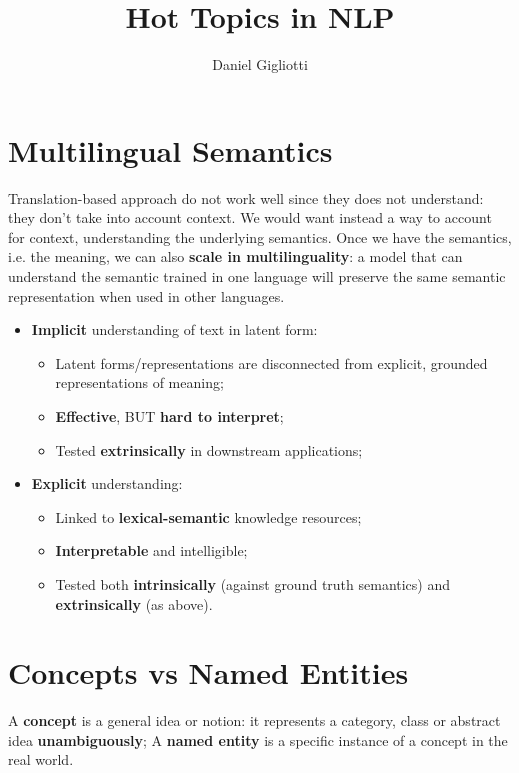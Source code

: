 \documentclass{article}
\title{Hot Topics in NLP}
\author{Daniel Gigliotti}
\date{}
\begin{document}
\maketitle

\section{Multilingual Semantics}

Translation-based approach do not work well since they does not understand: they don't take into account context. We would want instead a way to account for context, understanding the underlying semantics. Once we have the semantics, i.e. the meaning, we can also \textbf{scale in multilinguality}: a model that can understand the semantic trained in one language will preserve the same semantic representation when used in other languages.

\begin{itemize}
    \item \textbf{Implicit} understanding of text\textbf{} in latent form:
    \begin{itemize}
        \item Latent forms/representations are disconnected from explicit, grounded representations of meaning;
        \item \textbf{Effective}, BUT \textbf{hard to interpret};
        \item Tested \textbf{extrinsically} in downstream applications;
    \end{itemize}
    \item \textbf{Explicit} understanding:
    \begin{itemize}
        \item Linked to \textbf{lexical-semantic} knowledge resources;
        \item \textbf{Interpretable} and intelligible;
        \item Tested both \textbf{intrinsically} (against ground truth semantics) and \textbf{extrinsically} (as above).
    \end{itemize}
\end{itemize}

\section{Concepts vs Named Entities}

A \textbf{concept} is a general idea or notion: it represents a category, class or abstract idea \textbf{unambiguously};
A \textbf{named entity} is a specific instance of a concept in the real world.
\end{document}
